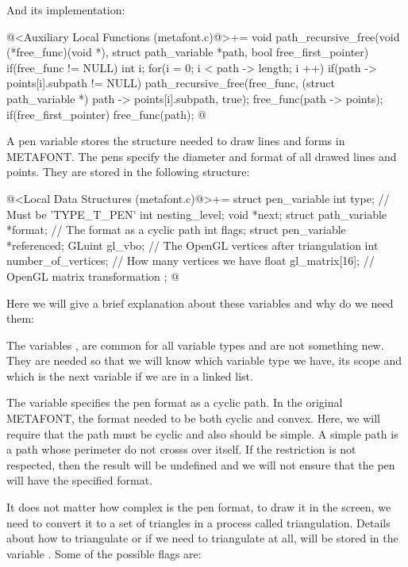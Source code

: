 And its implementation:

\iniciocodigo
@<Auxiliary Local Functions (metafont.c)@>+=
void path_recursive_free(void (*free_func)(void *),
                         struct path_variable *path,
                         bool free_first_pointer){
  if(free_func != NULL){
    int i;
    for(i = 0; i < path -> length; i ++){
      if(path -> points[i].subpath != NULL)
        path_recursive_free(free_func, (struct path_variable *)
                                       path -> points[i].subpath, true);
    }
    free_func(path -> points);
    if(free_first_pointer)
      free_func(path);
  }
}
@
\fimcodigo


A pen variable stores the structure needed to draw lines and forms in
METAFONT. The pens specify the diameter and format of all drawed lines
and points. They are stored in the following structure:

\iniciocodigo
@<Local Data Structures (metafont.c)@>+=
struct pen_variable{
  int type; // Must be 'TYPE_T_PEN'
  int nesting_level;
  void *next;
  struct path_variable *format; // The format as a cyclic path
  int flags;
  struct pen_variable *referenced;
  GLuint gl_vbo; // The OpenGL vertices after triangulation
  int number_of_vertices; // How many vertices we have
  float gl_matrix[16]; // OpenGL matrix transformation
};
@
\fimcodigo

Here we will give a brief explanation about these variables and why do
we need them:

The variables , 
are  common for all variable types and are not
something new. They are needed so that we will know which variable
type we have, its scope and which is the next variable if we are in a
linked list.

The variable  specifies the pen format as a cyclic
path. In the original METAFONT, the format needed to be both cyclic
and convex. Here, we will require that the path must be cyclic and
also should be simple. A simple path is a path whose perimeter do not
crosss over itself. If the restriction is not respected, then the
result will be undefined and we will not ensure that the pen will have
the specified format.

It does not matter how complex is the pen format, to draw it in the
screen, we need to convert it to a set of triangles in a process
called triangulation. Details about how to triangulate or if we need
to triangulate at all, will be stored in the
variable . Some of the possible flags are:

